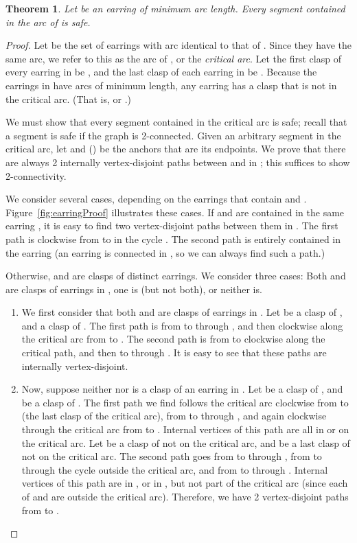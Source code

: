 \documentclass[11pt]{article}
\newtheorem{theorem}[lemma]{Theorem}
\begin{document}
\begin{theorem}\label{thm:earringProof}
Let  be an earring of minimum arc length. Every segment contained
in the arc of  is safe.
\end{theorem}
\begin{proof}
  Let  be the set of earrings with arc identical to that
  of . Since they have the same arc, we refer to this as the arc of
  , or the \emph{critical arc}. Let the first clasp of
  every earring in  be , and the last clasp of each
  earring in  be . Because the earrings in
   have arcs of minimum length, any earring  has a clasp  that is not in the critical arc. (That
  is,  or .)

  We must show that every segment contained in the critical arc is
  safe; recall that a segment  is safe if the graph  is
  2-connected.  Given an arbitrary segment  in the critical arc,
  let  and  () be the anchors that are its
  endpoints. We prove that there are always 2 internally
  vertex-disjoint paths between  and  in ; this
  suffices to show 2-connectivity.

  We consider several cases, depending on the earrings that contain
   and . Figure~\ref{fig:earringProof} illustrates these
  cases.  If  and  are contained in the same earring ,
  it is easy to find two vertex-disjoint paths between them in
  . The first path is clockwise from  to  in the cycle
  . The second path is entirely contained in the earring  (an
  earring is connected in , so we can always find such a path.)

  Otherwise,  and  are clasps of distinct earrings. We
  consider three cases: Both  and  are clasps of earrings in
  , one is (but not both), or neither is.
  \begin{enumerate}
  \item We first consider that both  and  are clasps of
    earrings in . Let  be a clasp of , and 
    a clasp of . The first path is from  to  through
    , and then clockwise along the critical arc from  to
    . The second path is from  to  clockwise along the
    critical path, and then  to  through . It is easy
    to see that these paths are internally vertex-disjoint.

  \item Now, suppose neither  nor  is a clasp of an earring
    in . Let  be a clasp of , and  be a
    clasp of . The first path we find follows the critical arc
    clockwise from  to  (the last clasp of the critical
    arc), from  to  through , and again
    clockwise through the critical arc from  to . Internal
    vertices of this path are all in  or on the critical arc. Let
     be a clasp of  not on the critical arc, and 
    be a last clasp of  not on the critical arc. The second path
    goes from  to  through , from  to 
    through the cycle  outside the critical arc, and from 
    to  through . Internal vertices of this path are in
    , or in , but not part of the critical arc (since
    each of  and  are outside the critical arc).
    Therefore, we have 2 vertex-disjoint paths from  to .



\end{enumerate}
\end{proof}
\end{document}
